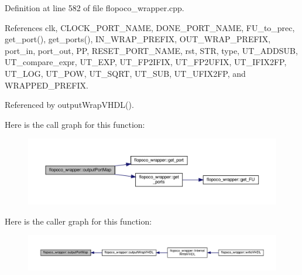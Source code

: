 Definition at line 582 of file flopoco\+\_\+wrapper.\+cpp.



References clk, C\+L\+O\+C\+K\+\_\+\+P\+O\+R\+T\+\_\+\+N\+A\+ME, D\+O\+N\+E\+\_\+\+P\+O\+R\+T\+\_\+\+N\+A\+ME, F\+U\+\_\+to\+\_\+prec, get\+\_\+port(), get\+\_\+ports(), I\+N\+\_\+\+W\+R\+A\+P\+\_\+\+P\+R\+E\+F\+IX, O\+U\+T\+\_\+\+W\+R\+A\+P\+\_\+\+P\+R\+E\+F\+IX, port\+\_\+in, port\+\_\+out, PP, R\+E\+S\+E\+T\+\_\+\+P\+O\+R\+T\+\_\+\+N\+A\+ME, rst, S\+TR, type, U\+T\+\_\+\+A\+D\+D\+S\+UB, U\+T\+\_\+compare\+\_\+expr, U\+T\+\_\+\+E\+XP, U\+T\+\_\+\+F\+P2\+I\+F\+IX, U\+T\+\_\+\+F\+P2\+U\+F\+IX, U\+T\+\_\+\+I\+F\+I\+X2\+FP, U\+T\+\_\+\+L\+OG, U\+T\+\_\+\+P\+OW, U\+T\+\_\+\+S\+Q\+RT, U\+T\+\_\+\+S\+UB, U\+T\+\_\+\+U\+F\+I\+X2\+FP, and W\+R\+A\+P\+P\+E\+D\+\_\+\+P\+R\+E\+F\+IX.



Referenced by output\+Wrap\+V\+H\+D\+L().

Here is the call graph for this function\+:
\nopagebreak
\begin{figure}[H]
\begin{center}
\leavevmode
\includegraphics[width=350pt]{d7/dbf/classflopoco__wrapper_aeaeed1e93ec604948ffff0085503cd3b_cgraph}
\end{center}
\end{figure}
Here is the caller graph for this function\+:
\nopagebreak
\begin{figure}[H]
\begin{center}
\leavevmode
\includegraphics[width=350pt]{d7/dbf/classflopoco__wrapper_aeaeed1e93ec604948ffff0085503cd3b_icgraph}
\end{center}
\end{figure}
\mbox{\label{classflopoco__wrapper_a1220164a60b0fbd7e1257e1401dd0897}} 
